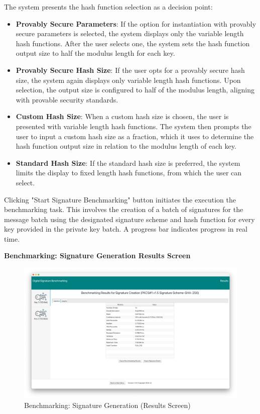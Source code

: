 \documentclass[]{final_report}
\begin{document}
The system presents the hash function selection as a decision point:
\begin{itemize}
    \item \textbf{Provably Secure Parameters}: If the option for instantiation with provably secure parameters is selected, the system displays only the variable length hash functions. After the user selects one, the system sets the hash function output size to half the modulus length for each key.
    \item \textbf{Provably Secure Hash Size}: If the user opts for a provably secure hash size, the system again displays only variable length hash functions. Upon selection, the output size is configured to half of the modulus length, aligning with provable security standards.
    \item \textbf{Custom Hash Size}: When a custom hash size is chosen, the user is presented with variable length hash functions. The system then prompts the user to input a custom hash size as a fraction, which it uses to determine the hash function output size in relation to the modulus length of each key.
    \item \textbf{Standard Hash Size}: If the standard hash size is preferred, the system limits the display to fixed length hash functions, from which the user can select.
\end{itemize}


Clicking "Start Signature Benchmarking" button initiates the execution the benchmarking task. This involves the creation of a batch of signatures for the message batch using the designated signature scheme and hash function for every key provided in the private key batch. A progress bar indicates progress in real time.


\textbf{Benchmarking: Signature Generation Results Screen}

\begin{figure}[H]
    \centering
    \includegraphics[scale= 0.325]{main_pictures/ui/signing/benchmarking/signing6.png}
   \caption{Benchmarking: Signature Generation (Results Screen)}
\end{figure}
\end{document}

